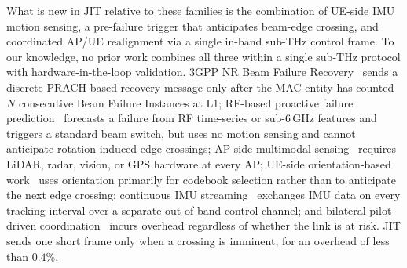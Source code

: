 \documentclass{article}
\begin{document}
\noindent What is new in JIT relative to these families is the combination of UE-side IMU motion sensing, a pre-failure trigger that anticipates beam-edge crossing, and coordinated AP/UE realignment via a single in-band sub-THz control frame. To our knowledge, no prior work combines all three within a single sub-THz protocol with hardware-in-the-loop validation. 3GPP NR Beam Failure Recovery~\cite{Giordani2018ATO, Heng2021SixChallenges} sends a discrete PRACH-based recovery message only after the MAC entity has counted $N$ consecutive Beam Failure Instances at L1; RF-based proactive failure prediction~\cite{9838772, Alrabeiah2020DeepLearning} forecasts a failure from RF time-series or sub-6\,GHz features and triggers a standard beam switch, but uses no motion sensing and cannot anticipate rotation-induced edge crossings; AP-side multimodal sensing~\cite{Alkhateeb2023DeepSense, Jiang2023LiDAR, Morais2023Position} requires LiDAR, radar, vision, or GPS hardware at every AP; UE-side orientation-based work~\cite{Rezaie2022Orientation, Struye2023CoVRage} uses orientation primarily for codebook selection rather than to anticipate the next edge crossing; continuous IMU streaming~\cite{Brambilla_2019} exchanges IMU data on every tracking interval over a separate out-of-band control channel; and bilateral pilot-driven coordination~\cite{Alkhateeb2018DLCB, Xue2023Standardization, Heng2021SixChallenges} incurs overhead regardless of whether the link is at risk. JIT sends one short frame only when a crossing is imminent, for an overhead of less than $0.4\%$.\\
\end{document}
